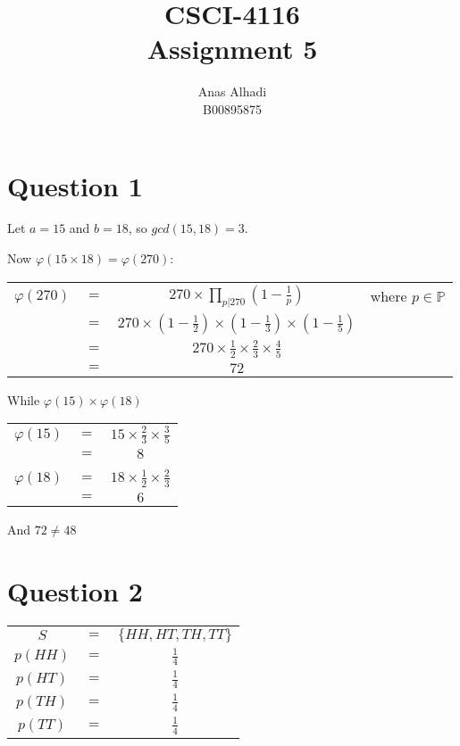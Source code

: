 \documentclass{article}
\title{\textbf{CSCI-4116\\Assignment 5}}
\author{Anas Alhadi\\B00895875}
\numberwithin{equation}{subsection}
\begin{document}
	\maketitle

	

	\section*{Question 1}
	Let $a=15$ and $b=18$, so $gcd(15,18) = 3$. 
	
	\vspace{10pt}
	Now $\varphi(15\times18)=\varphi(270)$: 

	\begin{tabular}{c c c c}
		$\varphi(270)$	&	$=$	&	$270 \times \prod_{p|270}(1-\frac{1}{p})$	&	\quad where $p \in \mathbb{P}$ \\
										&	$=$	&	$270 \times (1-\frac{1}{2}) \times (1- \frac{1}{3}) \times (1-\frac{1}{5})$	&	\\
										&	$=$	&	$270 \times \frac{1}{2} \times \frac{2}{3} \times \frac{4}{5}$	& \\
										& $=$	&	$72$
	\end{tabular}

	\vspace{15pt}
	While $\varphi(15) \times \varphi(18)$

	\begin{tabular}{c c c}
		$\varphi(15)$	&	$=$	&	$15 \times \frac{2}{3} \times \frac{3}{5}$ \\
									&	$=$	&	$8$ \\
									&			&			\\
		$\varphi(18)$	&	$=$	&	$18 \times \frac{1}{2} \times \frac{2}{3}$ \\
									&	$=$	&	$6$

	\end{tabular}

	\vspace{15pt}
	And $72 \not = 48$
	
	\newpage
	\thispagestyle{fancy}


	\section*{Question 2}
	\begin{tabular}{c c c}
		$S$			&	$=$	&	$\{HH, HT, TH, TT\}$ \\	
		$p(HH)$	&	$=$	&	$\frac{1}{4}$ \\
		$p(HT)$	&	$=$	&	$\frac{1}{4}$ \\
		$p(TH)$	&	$=$	&	$\frac{1}{4}$ \\
		$p(TT)$	&	$=$	&	$\frac{1}{4}$ \\
	\end{tabular}
\end{document}

